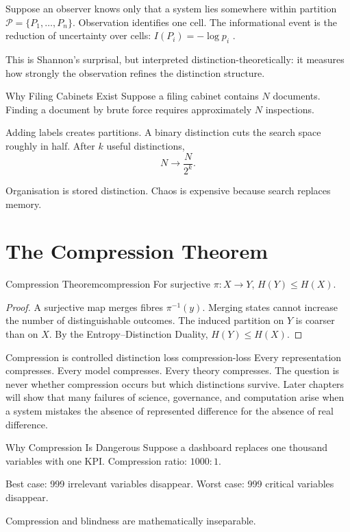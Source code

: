 \documentclass[12pt,twoside,openright]{book}
\newcommand{\partition}{\mathcal{P}}
\begin{document}
Suppose an observer knows only that a system lies
somewhere within partition $\partition = \{P_1,\ldots,P_n\}$.
Observation identifies one cell. The informational event
is the reduction of uncertainty over cells:
$I(P_i) = -\log p_i$ \parencite{shannon1948,mackay2003}.

This is Shannon's surprisal, but interpreted
distinction-theoretically: it measures how strongly the
observation refines the distinction structure.

\begin{envelopeaside}{Why Filing Cabinets Exist}
Suppose a filing cabinet contains $N$ documents. Finding a
document by brute force requires approximately $N$
inspections.

Adding labels creates partitions. A binary distinction cuts
the search space roughly in half. After $k$ useful
distinctions,
\[
  N \to \frac{N}{2^k}.
\]

Organisation is stored distinction. Chaos is expensive
because search replaces memory.
\end{envelopeaside}

\section{The Compression Theorem}
\label{sec:ch2-compression}

\begin{theorem}{Compression Theorem}{compression}
  For surjective $\pi: X \to Y$, $H(Y) \le H(X)$.
\end{theorem}

\begin{proof}
  A surjective map merges fibres $\pi^{-1}(y)$.
  Merging states cannot increase the number of
  distinguishable outcomes. The induced partition on $Y$
  is coarser than on $X$. By the Entropy--Distinction
  Duality, $H(Y) \le H(X)$.
\end{proof}

\begin{remark}{Compression is controlled distinction loss}%
  {compression-loss}
  Every representation compresses. Every model compresses.
  Every theory compresses. The question is never whether
  compression occurs but which distinctions survive.
  Later chapters will show that many failures of science,
  governance, and computation arise when a system mistakes
  the absence of represented difference for the absence
  of real difference.
\end{remark}

\begin{envelopeaside}{Why Compression Is Dangerous}
Suppose a dashboard replaces one thousand variables with one
KPI. Compression ratio: $1000{:}1$.

Best case: 999 irrelevant variables disappear. Worst case:
999 critical variables disappear.

Compression and blindness are mathematically inseparable.
\end{envelopeaside}
\end{document}
